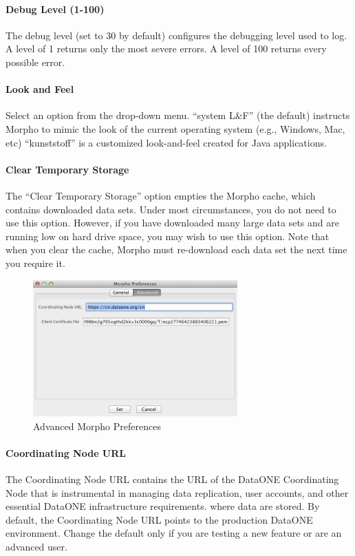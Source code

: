 \paragraph{Debug Level (1-100)} The debug level (set to 30 by default)
configures the debugging level used to log. A level of 1 returns only
the most severe errors. A level of 100 returns every possible error.

\paragraph{Look and Feel} Select an option from the drop-down menu.
``system L\&F'' (the default) instructs Morpho to mimic the look of the
current operating system (e.g., Windows, Mac, etc) ``kunststoff'' is a
customized look-and-feel created for Java applications.

\paragraph{Clear Temporary Storage} The ``Clear Temporary Storage''
option empties the Morpho cache, which contains downloaded data sets.
Under most circumstances, you do not need to use this option. However,
if you have downloaded many large data sets and are running low on hard
drive space, you may wish to use this option. Note that when you clear
the cache, Morpho must re-download each data set the next time you
require it.

\begin{figure}
  \centering
    \includegraphics[width=0.7\textwidth]{images/dialog-preferences-advanced.png}
  \caption{Advanced Morpho Preferences}
  \label{fig:dialog-preferences-advanced}
\end{figure}

\paragraph{Coordinating Node URL} The Coordinating Node URL contains the URL 
of the DataONE Coordinating Node that is instrumental in managing data replication, 
user accounts, and other essential DataONE infrastructure requirements.
where data are stored. By default, the Coordinating Node URL points to the
production DataONE environment. Change the default only if you are testing a new feature or 
are an advanced user.

